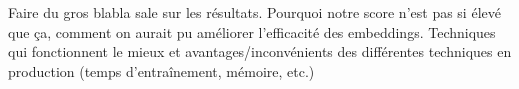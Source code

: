 Faire du gros blabla sale sur les résultats. Pourquoi notre score n'est pas si élevé que ça, comment on aurait pu améliorer l'efficacité des embeddings. Techniques qui fonctionnent le mieux et avantages/inconvénients des différentes techniques en production (temps d'entraînement, mémoire, etc.)